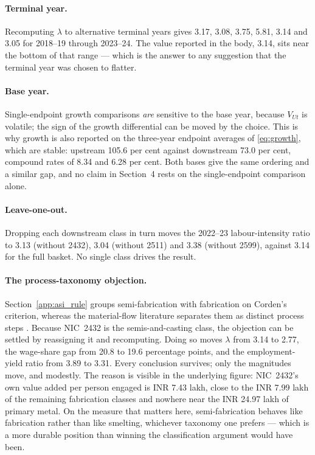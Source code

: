 \documentclass[11pt, a4paper]{article}
\numberwithin{figure}{section}
\numberwithin{table}{section}
\begin{document}
\paragraph{Terminal year.} Recomputing $\lambda$ to alternative terminal years gives
3.17, 3.08, 3.75, 5.81, 3.14 and 3.05 for 2018--19 through 2023--24. The value
reported in the body, 3.14, sits near the bottom of that range --- which is the answer
to any suggestion that the terminal year was chosen to flatter.

\paragraph{Base year.} Single-endpoint growth comparisons \emph{are} sensitive to the
base year, because $V_{Ut}$ is volatile; the sign of the growth differential can be
moved by the choice. This is why growth is also reported on the three-year endpoint
averages of \eqref{eq:growth}, which are stable: upstream 105.6 per cent against
downstream 73.0 per cent, compound rates of 8.34 and 6.28 per cent. Both bases give
the same ordering and a similar gap, and no claim in Section~4 rests on the
single-endpoint comparison alone.

\paragraph{Leave-one-out.} Dropping each downstream class in turn moves the 2022--23
labour-intensity ratio to 3.13 (without 2432), 3.04 (without 2511) and 3.38 (without
2599), against 3.14 for the full basket. No single class drives the result.

\paragraph{The process-taxonomy objection.} Section~\ref{app:asi_rule} groups
semi-fabrication with fabrication on Corden's criterion, whereas the material-flow
literature separates them as distinct process steps \cite{cullen2013,bertram2009}.
Because NIC~2432 is the semis-and-casting class, the objection can be settled by
reassigning it and recomputing. Doing so moves $\lambda$ from 3.14 to 2.77, the
wage-share gap from 20.8 to 19.6 percentage points, and the employment-yield ratio
from 3.89 to 3.31. Every conclusion survives; only the magnitudes move, and modestly.
The reason is visible in the underlying figure: NIC~2432's own value added per person
engaged is INR 7.43 lakh, close to the INR 7.99 lakh of the remaining fabrication
classes and nowhere near the INR 24.97 lakh of primary metal. On the measure that
matters here, semi-fabrication behaves like fabrication rather than like smelting,
whichever taxonomy one prefers --- which is a more durable position than winning the
classification argument would have been.
\end{document}
